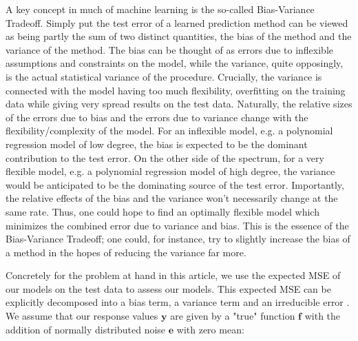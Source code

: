 \documentclass[reprint, english, nofootinbib]{revtex4-2}
\begin{document}
        A key concept in much of machine learning is the so-called Bias-Variance Tradeoff. Simply put the test error of a learned prediction method can be viewed as being partly the sum of two distinct quantities, the bias of the method and the variance of the method. The bias can be thought of as errors due to inflexible assumptions and constraints on the model, while the variance, quite opposingly, is the actual statistical variance of the procedure. Crucially, the variance is connected with the model having too much flexibility, overfitting on the training data while giving very spread results on the test data. Naturally, the relative sizes of the errors due to bias and the errors due to variance change with the flexibility/complexity of the model. For an inflexible model, e.g. a polynomial regression model of low degree, the bias is expected to be the dominant contribution to the test error. On the other side of the spectrum, for a very flexible model, e.g. a polynomial regression model of high degree, the variance would be anticipated to be the dominating source of the test error. Importantly, the relative effects of the bias and the variance won't necessarily change at the same rate. Thus, one could hope to find an optimally flexible model which minimizes the combined error due to variance and bias. This is the essence of the Bias-Variance Tradeoff; one could, for instance, try to slightly increase the bias of a method in the hopes of reducing the variance far more.

        Concretely for the problem at hand in this article, we use the expected MSE of our models on the test data to assess our models. This expected MSE can be explicitly decomposed into a bias term, a variance term and an irreducible error \cite{hastie}. We assume that our  response values $\pmb{y}$ are given by a "true" function $\pmb{f}$ with the addition of normally distributed noise $\pmb{e}$ with zero mean:
\end{document}
